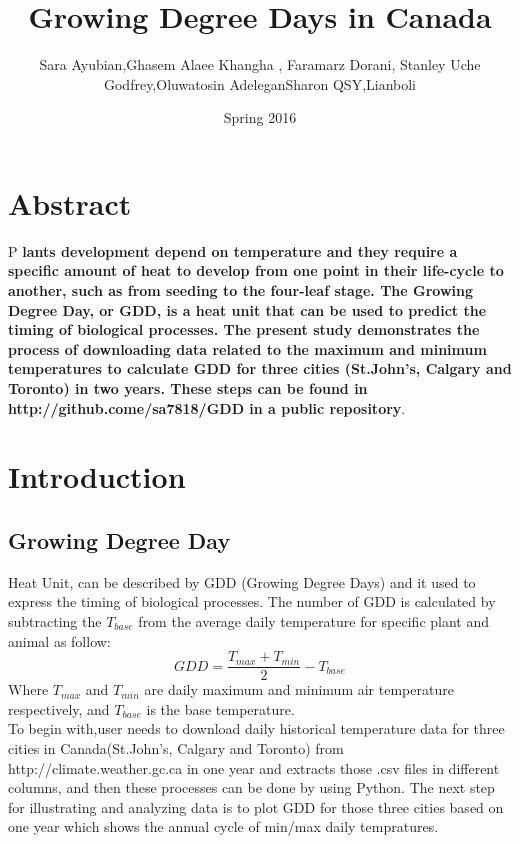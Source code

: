 \documentclass[DIV=calc, paper=a4, fontsize=11pt, twocolumn]{scrartcl}
\title{Growing Degree Days in Canada}
\author{Sara Ayubian\affmark[1]    ,Ghasem Alaee Khangha \affmark[1],    Faramarz Dorani\affmark[1],
Stanley Uche Godfrey\affmark[1],Oluwatosin Adelegan\affmark[1]
Sharon QSY\affmark[1],Lianboli\affmark[1]}
\date{Spring 2016}
\newcommand{\initial}[1]{ 
\lettrine[lines=3,lhang=0.3,nindent=0em]{
\color{DarkGoldenrod}
{\textsf{#1}}}{}}
\begin{document}
\maketitle 
\thispagestyle{fancy} 
\section{Abstract}

\initial{P}\textbf{ lants development depend on temperature and they require a specific amount of heat to develop from one point in their life-cycle to another, such as from seeding to the four-leaf stage. The Growing Degree Day, or GDD, is a heat unit that can be used to predict the timing of biological processes. The present study demonstrates the process of downloading data related to the maximum and minimum temperatures to calculate GDD for three cities (St.John's, Calgary and Toronto) in two years. These steps can be found in http://github.come/sa7818/GDD in a public repository}.
	
	
	
\section{Introduction}
\subsection{Growing Degree Day}

Heat Unit, can be described by GDD (Growing Degree Days) and it used to express the timing of biological processes. The number of GDD is calculated by subtracting the $T_{base}$ from the average daily temperature for specific plant and animal as follow:
\begin{equation}
GDD =\frac {T_{max}+T_{min}}{2}-T_{base}
\end{equation}
Where $T_{max}$ and $T_{min}$ are daily maximum and minimum air temperature respectively, and $T_{base}$ is the base temperature.\\

To begin with,user needs to download daily historical temperature data for three cities in Canada(St.John's, Calgary and Toronto) from http://climate.weather.gc.ca in one year and extracts those .csv files in different columns, and then these processes can be done by using Python.
The next step for illustrating and analyzing data is to plot GDD for those three cities based on one year which shows the annual cycle of min/max daily tempratures.
\end{document}
